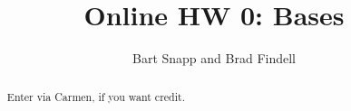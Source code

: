 \documentclass[handout,space,nooutcomes]{xourse}
\title{Online HW 0: Bases}
\author{Bart Snapp and Brad Findell}
\begin{document}
\begin{abstract}
Enter via Carmen, if you want credit.  
\end{abstract}
\maketitle

\end{document}
